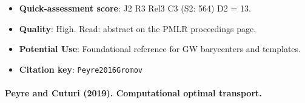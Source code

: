 \documentclass[journal,onecolumn]{IEEEtran}
\begin{document}
\begin{itemize}
\item{} \textbf{Quick-assessment score}: J2 R3 Rel3 C3 (S2: 564) D2 = 13.

\item{} \textbf{Quality}: High. Read: abstract on the PMLR proceedings page.

\item{} \textbf{Potential Use}: Foundational reference for GW barycenters and templates.

\item{} \textbf{Citation key}: \texttt{Peyre2016Gromov}

\end{itemize}

\paragraph{Peyre and Cuturi (2019). Computational optimal transport.~\cite{Peyre2019Computational}}\mbox{}
\end{document}
